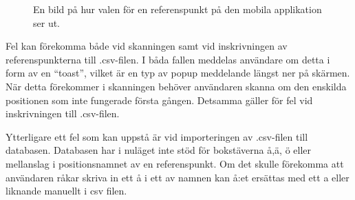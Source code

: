 \documentclass[a4paper,12pt]{article}
\begin{document}
 \begin{figure}[H]
   \centering
   \caption{En bild på hur valen för en referenspunkt på den mobila applikation ser ut.}
   \label{fig:mob_scan_ref_option}
 \end{figure}

 Fel kan förekomma både vid skanningen samt vid inskrivningen av referenspunkterna till .csv-filen. I båda fallen meddelas användare om detta i form av en ``toast'', vilket är en typ av popup meddelande längst ner på skärmen. När detta förekommer i skanningen behöver användaren skanna om den enskilda positionen som inte fungerade första gången. Detsamma gäller för fel vid inskrivningen till .csv-filen.

 Ytterligare ett fel som kan uppstå är vid importeringen av .csv-filen till databasen. Databasen har i nuläget inte stöd för bokstäverna å,ä, ö eller mellanslag i positionsnamnet av en referenspunkt. Om det skulle förekomma att användaren råkar skriva in ett å i ett av namnen kan å:et ersättas med ett a eller liknande manuellt i csv filen.
\end{document}
